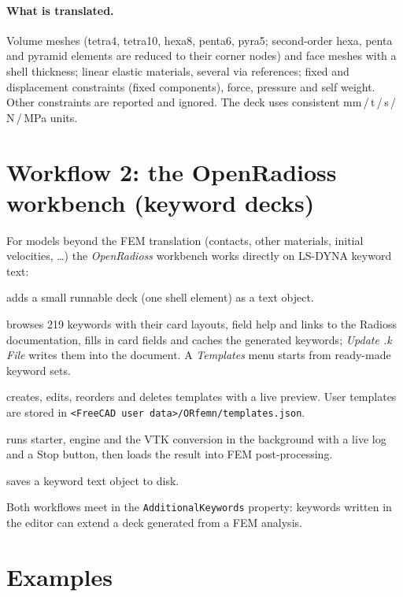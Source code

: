 \documentclass[11pt,a4paper]{article}
\begin{document}
\paragraph{What is translated.}
Volume meshes (tetra4, tetra10, hexa8, penta6, pyra5; second-order hexa, penta and pyramid elements
are reduced to their corner nodes) and face meshes with a shell thickness; linear elastic materials,
several via references; fixed and displacement constraints (fixed components), force, pressure and
self weight. Other constraints are reported and ignored. The deck uses consistent
mm\,/\,t\,/\,s\,/\,N\,/\,MPa units.

\section{Workflow 2: the OpenRadioss workbench (keyword decks)}

For models beyond the FEM translation (contacts, other materials, initial velocities, \dots) the
\emph{OpenRadioss} workbench works directly on LS-DYNA keyword text:

\begin{description}[font=\sffamily\bfseries,leftmargin=1em]
  \item[Create Basic .k File] adds a small runnable deck (one shell element) as a text object.
  \item[Keyword Editor] browses 219 keywords with their card layouts, field help and links to the
        Radioss documentation, fills in card fields and caches the generated keywords;
        \emph{Update .k File} writes them into the document. A \emph{Templates} menu starts from
        ready-made keyword sets.
  \item[Template Editor] creates, edits, reorders and deletes templates with a live preview.
        User templates are stored in \texttt{<FreeCAD user data>/ORfemn/templates.json}.
  \item[Run OpenRadioss] runs starter, engine and the VTK conversion in the background with a live
        log and a Stop button, then loads the result into FEM post-processing.
  \item[Export LS-DYNA .k File] saves a keyword text object to disk.
\end{description}
Both workflows meet in the \texttt{AdditionalKeywords} property: keywords written in the editor
can extend a deck generated from a FEM analysis.

\section{Examples}
\end{document}
